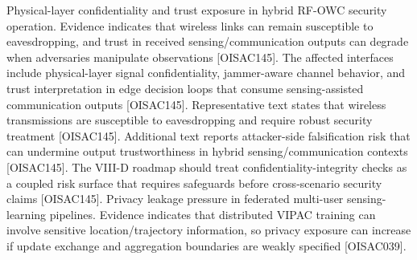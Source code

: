 {}\markdownRendererOlBegin
{} Physical-layer confidentiality and trust exposure in hybrid RF-OWC security operation.\markdownRendererOlItemEnd 
{} Evidence indicates that wireless links can remain susceptible to eavesdropping, and trust in received sensing/communication outputs can degrade when adversaries manipulate observations [O\markdownRendererUnderscore{}ISAC\markdownRendererUnderscore{}145].\markdownRendererOlItemEnd 
{} The affected interfaces include physical-layer signal confidentiality, jammer-aware channel behavior, and trust interpretation in edge decision loops that consume sensing-assisted communication outputs [O\markdownRendererUnderscore{}ISAC\markdownRendererUnderscore{}145].\markdownRendererOlItemEnd 
{} Representative text states that wireless transmissions are susceptible to eavesdropping and require robust security treatment [O\markdownRendererUnderscore{}ISAC\markdownRendererUnderscore{}145]. Additional text reports attacker-side falsification risk that can undermine output trustworthiness in hybrid sensing/communication contexts [O\markdownRendererUnderscore{}ISAC\markdownRendererUnderscore{}145].\markdownRendererOlItemEnd 
{} The VIII-D roadmap should treat confidentiality-integrity checks as a coupled risk surface that requires safeguards before cross-scenario security claims [O\markdownRendererUnderscore{}ISAC\markdownRendererUnderscore{}145].\markdownRendererOlItemEnd 
\markdownRendererOlEnd \markdownRendererInterblockSeparator
{}
\markdownRendererSectionEnd \markdownRendererSectionBegin
{}\markdownRendererInterblockSeparator
{}\markdownRendererOlBegin
{} Privacy leakage pressure in federated multi-user sensing-learning pipelines.\markdownRendererOlItemEnd 
{} Evidence indicates that distributed VIPAC training can involve sensitive location/trajectory information, so privacy exposure can increase if update exchange and aggregation boundaries are weakly specified [O\markdownRendererUnderscore{}ISAC\markdownRendererUnderscore{}039].\markdownRendererOlItemEnd 

